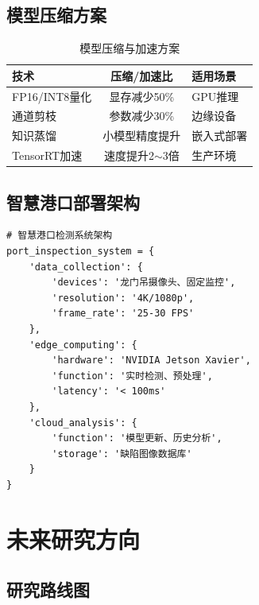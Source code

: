 \documentclass[12pt,a4paper]{ctexart}
\theoremstyle{cumcm}
\begin{document}
\subsection{模型压缩方案}

\begin{table}[H]
\centering
{}
\caption{模型压缩与加速方案}
\begin{tabular}{lcl}
\toprule
\textbf{技术} & \textbf{压缩/加速比} & \textbf{适用场景} \\
\midrule
FP16/INT8量化 & 显存减少50\% & GPU推理 \\
通道剪枝 & 参数减少30\% & 边缘设备 \\
知识蒸馏 & 小模型精度提升 & 嵌入式部署 \\
TensorRT加速 & 速度提升2$\sim$3倍 & 生产环境 \\
\bottomrule
\end{tabular}
\end{table}

\subsection{智慧港口部署架构}

\begin{lstlisting}
# 智慧港口检测系统架构
port_inspection_system = {
    'data_collection': {
        'devices': '龙门吊摄像头、固定监控',
        'resolution': '4K/1080p',
        'frame_rate': '25-30 FPS'
    },
    'edge_computing': {
        'hardware': 'NVIDIA Jetson Xavier',
        'function': '实时检测、预处理',
        'latency': '< 100ms'
    },
    'cloud_analysis': {
        'function': '模型更新、历史分析',
        'storage': '缺陷图像数据库'
    }
}
\end{lstlisting}

\section{未来研究方向}

\subsection{研究路线图}
\end{document}
